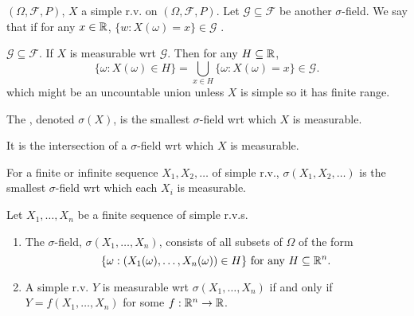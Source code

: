 \documentclass[class=article,crop=false]{standalone}
\begin{document}
\begin{defn}[]
	$ (\Omega,\mathcal{F},P)$, $ X$ a simple r.v. on  $ (\Omega,\mathcal{F},P)$. Let $ \mathcal{ G} \subseteq \mathcal{F}$ be another $\sigma$-field. We say that  if for any $ x \in \mathbb{R}$, $ \{w:X(\omega)=x\} \in \mathcal{ G} $ .
\end{defn}

\begin{note}[]
$ \mathcal{ G} \subseteq \mathcal{F}$. If $ X$ is measurable wrt  $ \mathcal{ G}$. Then for any $ H \subseteq \mathbb{R}$,
\[
	\{\omega:X(\omega) \in H\} = \bigcup_{x \in H} \{\omega: X(\omega) = x\} \in \mathcal{ G}
.\] 
which might be an uncountable union unless $ X$ is simple so it has finite range.
\end{note}

\begin{defn}
	The , denoted $ \sigma(X)$, is the smallest $\sigma$-field wrt which $ X$ is measurable. 
\end{defn}
\begin{note}[]
It is the intersection of a $\sigma$-field wrt which $ X$ is measurable.
\end{note}

\begin{defn}
	For a finite or infinite sequence $ X_1,X_2,\ldots$ of simple r.v., $\sigma(X_1,X_2,\ldots)$ is the smallest $\sigma$-field wrt which each $ X_i$ is measurable.
\end{defn}
\begin{thm}[5.1]
	Let $ X_1,\ldots,X_n$ be a finite sequence of simple r.v.s.
	\begin{enumerate}[label=(\roman*)]
		\item The $\sigma$-field, $ \sigma(X_1,\ldots,X_n)$, consists of all subsets of $ \Omega$ of the form 
			\[
				\{\omega:(X_1(\omega),\ldots,X_n(\omega)) \in H\} \text{ for any } H \subseteq \mathbb{R}^{n} 
			.\] 
		\item A simple r.v. $ Y$ is measurable wrt  $ \sigma(X_1,\ldots,X_n)$ if and only if $ Y=f(X_1,\ldots,X_n)$ for some $ f: \mathbb{R}^{n} \to \mathbb{R}$.
	\end{enumerate}
\end{thm}
\end{document}
